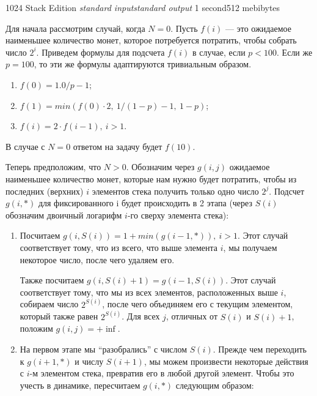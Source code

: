 \begin{problem}{1024 Stack Edition}
{\textsl{standard input}}{\textsl{standard output}}
{1 second}{512 mebibytes}{}

Для начала рассмотрим случай, когда $N = 0$. Пусть $f(i)$ --- это ожидаемое наименьшее количество монет, которое потребуется потратить, чтобы собрать число $2^i$. Приведем формулы для подсчета $f(i)$ в случае, если $p < 100$. Если же $p = 100$, то эти же формулы адаптируются тривиальным образом.

\begin{enumerate}

\item $f(0) = 1.0 / p - 1$;

\item $f(1) = min (f(0) \cdot 2,~1 / (1 - p) - 1,~1 - p)$;

\item $f(i) = 2 \cdot f(i - 1),~i > 1$.

\end{enumerate}

В случае с $N = 0$ ответом на задачу будет $f(10)$.

Теперь предположим, что $N > 0$. Обозначим через $g(i, j)$ ожидаемое наименьшее количество монет, которые нам нужно будет потратить, чтобы из последних (верхних) $i$ элементов стека получить только одно число $2^j$. Подсчет $g(i, *)$ для фиксированного i будет происходить в 2 этапа (через $S(i)$ обозначим двоичный логарифм $i$-го сверху элемента стека):

\begin{enumerate}

\item Посчитаем $g(i, S(i)) = 1 + min( g(i - 1, *) ),~i > 1$. Этот случай соответствует тому, что из всего, что выше элемента $i$, мы получаем некоторое число, после чего удаляем его.

Также посчитаем $g(i, S(i) + 1) = g(i - 1, S(i))$. Этот случай соответствует тому, что мы из всех элементов, расположенных выше $i$, собираем число $2^{S(i)}$, после чего объединяем его с текущим элементом, который также равен $2^{S(i)}$. Для всех $j$, отличных от $S(i)$ и $S(i) + 1$, положим $g(i, j) = +\inf$.

\item На первом этапе мы ``разобрались'' с числом $S(i)$. Прежде чем переходить к $g(i + 1, *)$ и числу $S(i + 1)$, мы можем произвести некоторые действия с $i$-м элементом стека, превратив его в любой другой элемент. Чтобы это учесть в динамике, пересчитаем $g(i, *)$ следующим образом: 


\end{enumerate}
\end{problem}
